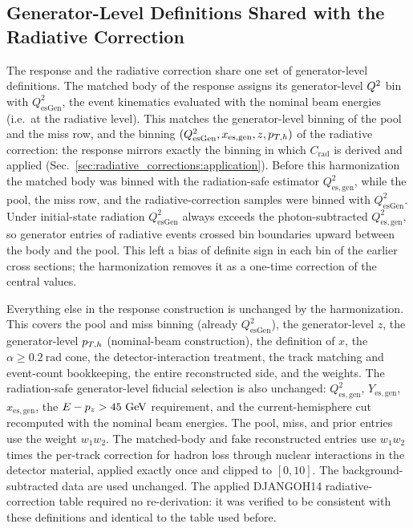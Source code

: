 \subsection{Generator-Level Definitions Shared with the Radiative Correction}
\label{sec:unfolding:truth-contract}

The response and the radiative correction share one set of generator-level
definitions.  The matched body of the response assigns its generator-level
$Q^{2}$ bin with $Q^2_{\mathrm{esGen}}$, the event kinematics evaluated with
the nominal beam energies (i.e.\ at the radiative level).  This matches the
generator-level binning of the pool and the miss row, and the binning
$(Q^2_{\mathrm{esGen}}, x_{\mathrm{es,gen}}, z, p_{T,h})$ of the radiative
correction: the response mirrors exactly the binning in which
$C_{\mathrm{rad}}$ is derived and applied
(Sec.~\ref{sec:radiative_corrections:application}).  Before this
harmonization the matched body was binned with the radiation-safe estimator
$Q^2_{\mathrm{es,gen}}$, while the pool, the miss row, and the
radiative-correction samples were binned with $Q^2_{\mathrm{esGen}}$.  Under
initial-state radiation $Q^2_{\mathrm{esGen}}$ always exceeds the
photon-subtracted $Q^2_{\mathrm{es,gen}}$, so generator entries of radiative
events crossed bin boundaries upward between the body and the pool.  This
left a bias of definite sign in each bin of the earlier cross sections; the
harmonization removes it as a one-time correction of the central values.

Everything else in the response construction is unchanged by the
harmonization.  This covers the pool and miss binning (already
$Q^2_{\mathrm{esGen}}$), the generator-level $z$, the generator-level $p_{T,h}$
(nominal-beam construction), the definition of $x$, the
$\alpha\ge0.2~\mathrm{rad}$ cone, the detector-interaction treatment, the
track matching and event-count bookkeeping, the entire reconstructed side,
and the weights.  The radiation-safe generator-level fiducial selection is
also unchanged: $Q^2_{\mathrm{es,gen}}$, $Y_{\mathrm{es,gen}}$,
$x_{\mathrm{es,gen}}$, the $E-p_z>45~\text{GeV}$ requirement, and the
current-hemisphere cut recomputed with the nominal beam energies.  The pool,
miss, and prior entries use the weight $w_{1}w_{2}$.  The matched-body and
fake reconstructed entries use $w_{1}w_{2}$ times the per-track correction
for hadron loss through nuclear interactions in the detector material,
applied exactly once and clipped to $[0,10]$.  The background-subtracted
data are used unchanged.  The applied DJANGOH14 radiative-correction table
required no re-derivation: it was verified to be consistent with these
definitions and identical to the table used before.

